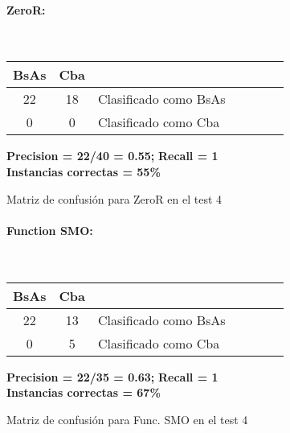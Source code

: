 \begin{figure}[H]
	\centering
	\paragraph*{ZeroR:}\mbox{}\\
	\begin{table}[H]
		\centering
		\begin{tabular}{|c|c|l|c|c|c|c|}
			\hline
			BsAs & Cba &  \\ \hline
			22 &  18 &  Clasificado como BsAs \\ \hline
			0  &   0 &  Clasificado como Cba \\ \hline
		\end{tabular}
	\end{table}
	\begin{center}
		\textbf{Precision = 22/40 = 0.55;} \textbf{Recall = 1}\\
		\textbf{Instancias correctas = 55\%}
	\end{center}
	\caption{Matriz de confusión para ZeroR en el test 4}
	\label{ZeroR_matrizconf}
\end{figure}

\begin{figure}[H]
	\centering
	\paragraph*{Function SMO:}\mbox{}\\
	\begin{table}[H]
		\centering
		\begin{tabular}{|c|c|l|c|c|c|c|}
			\hline
			BsAs & Cba &  \\ \hline
			22 &  13 &  Clasificado como BsAs \\ \hline
			0  &   5 &  Clasificado como Cba \\ \hline
		\end{tabular}
	\end{table}
	\begin{center}
		\textbf{Precision = 22/35 = 0.63;} \textbf{Recall = 1}\\
		\textbf{Instancias correctas = 67\%}
	\end{center}
	\caption{Matriz de confusión para Func. SMO en el test 4}
	\label{FSMO_matrizconf}
\end{figure}

